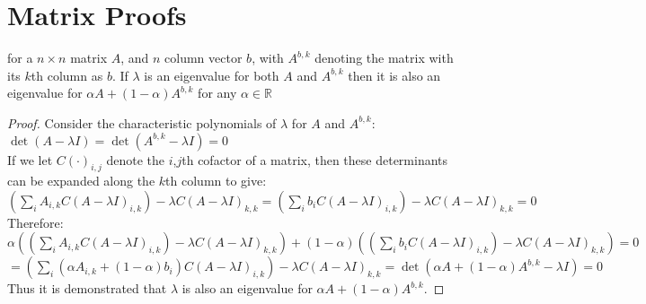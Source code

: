 \section{Matrix Proofs}\label{appendix5b}



\begin{lemma}\label{lem2}
for a $n\times n$ matrix $A$, and $n$ column vector $b$, with $A^{b,k}$ denoting the matrix with its $k$th column as $b$.
If $\lambda$ is an eigenvalue for both $A$ and $A^{b,k}$ then it is also an eigenvalue for $\alpha A + (1-\alpha)A^{b,k}$ for any $\alpha \in \mathbb{R}$
\end{lemma}
\begin{proof}
Consider the characteristic polynomials of $\lambda$ for $A$ and $A^{b,k}$:\\
$\det(A-\lambda I)=\det(A^{b,k}-\lambda I)=0$\\
If we let $C(\cdot)_{i,j}$ denote the $i$,$j$th cofactor of a matrix, then these determinants can be expanded along the $k$th column to give:\\
$\left(\sum_iA_{i,k}C(A-\lambda I)_{i,k}\right)-\lambda C(A-\lambda I)_{k,k}=\left(\sum_ib_iC(A-\lambda I)_{i,k}\right)-\lambda C(A-\lambda I)_{k,k}=0$\\
Therefore:\\
$\alpha\left(\left(\sum_iA_{i,k}C(A-\lambda I)_{i,k}\right)-\lambda C(A-\lambda I)_{k,k}\right) + (1-\alpha)\left(\left(\sum_ib_iC(A-\lambda I)_{i,k}\right)-\lambda C(A-\lambda I)_{k,k}\right)=0$\\
$=\left(\sum_i(\alpha A_{i,k}+(1-\alpha)b_i)C(A-\lambda I)_{i,k}\right)-\lambda C(A-\lambda I)_{k,k} =\det(\alpha A + (1-\alpha)A^{b,k}-\lambda I)=0$\\
Thus it is demonstrated that $\lambda$ is also an eigenvalue for $\alpha A + (1-\alpha)A^{b,k}$.
\end{proof}

